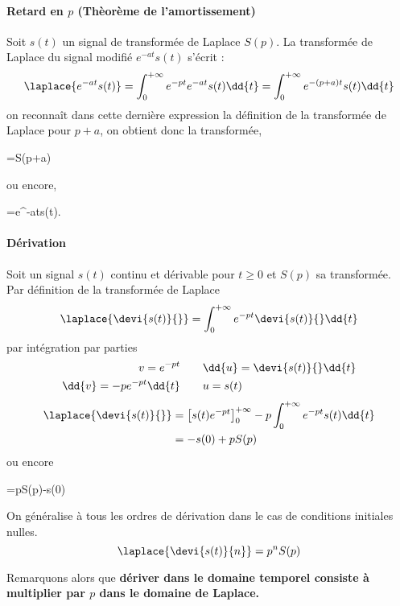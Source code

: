 \paragraph{Retard en $p$ (Thèorème de l'amortissement)}
Soit $s(t)$ un signal de transformée de Laplace $S(p)$. La transformée 
de Laplace du signal modifié $e^{-at}s(t)$ s'écrit :
$$
\laplace{e^{-at}s(t)}
=\int_{0}^{+\infty} e^{-pt}e^{-at}s(t)\dd{t}
=\int_{0}^{+\infty} e^{-(p+a)t}s(t)\dd{t}
$$
on reconnaît dans cette dernière expression la définition de la transformée 
de Laplace pour $p+a$, on obtient donc la transformée, 
\begin{bequation}
    =S(p+a)
\end{bequation}
ou encore,
\begin{bequation}
    =e^{-at}s(t).
\end{bequation}

\paragraph{Dérivation}
Soit un signal $s(t)$ continu et dérivable pour $t\ge0$ et $S(p)$ 
sa transformée. Par définition de la transformée de Laplace 
$$
\laplace{\devi{s(t)}{}}=\int_{0}^{+\infty} e^{-pt}\devi{s(t)}{}\dd{t}
$$
par intégration par parties
\begin{align*}
    v=e^{-pt}\qquad&\dd{u}=\devi{s(t)}{}\dd{t}\\
    \dd{v}=-pe^{-pt}\dd{t}\qquad&u=s(t)
\end{align*}
\begin{align*}
\laplace{\devi{s(t)}{}}&=\left[s(t)e^{-pt}\right]_0
                         ^{+\infty}-p\int_{0}^{+\infty}e^{-pt}s(t)\dd{t}\\
                       &=-s(0)+pS(p)
\end{align*}
ou encore
\begin{bequation}
    =pS(p)-s(0)
\end{bequation}
On généralise à tous les ordres de dérivation dans le cas de conditions 
initiales nulles.
$$
\laplace{\devi{s(t)}{n}}=p^nS(p)
$$

Remarquons alors que \textbf{dériver dans le domaine temporel consiste 
à multiplier par $p$ dans le domaine de Laplace.}
